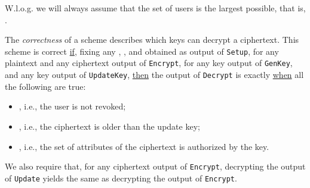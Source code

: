 \documentclass[a4paper,10pt]{article}
\newcommand{\singlefunction}[1]{\texttt{#1}}
\begin{document}
	W.l.o.g. we will always assume that the set  of users is the largest possible, that is, .
	
	The \emph{correctness} of a scheme describes which keys can decrypt a ciphertext. This scheme is correct \underline{if}, fixing any , , and  obtained as output of \singlefunction{Setup}, for any plaintext  and any ciphertext  output of \singlefunction{Encrypt}, for any key  output of \singlefunction{GenKey}, and any key  output of \singlefunction{UpdateKey}, \underline{then} the output of \singlefunction{Decrypt} is exactly  \underline{when} all the following are true:
	\begin{itemize}
		\item
		, i.e., the user  is not revoked;
		\item
		, i.e., the ciphertext is older than the update key;
		\item
		, i.e., the set of attributes of the ciphertext is authorized by the key.
	\end{itemize}
	

	We also require that, for any ciphertext  output of \singlefunction{Encrypt}, decrypting the output of \singlefunction{Update} yields the same as decrypting the output of \singlefunction{Encrypt}. 
\end{document}

